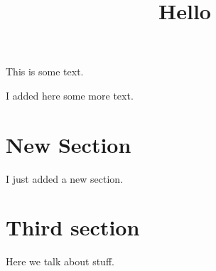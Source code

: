 \documentclass{article}
\title{Hello}
\begin{document}
\maketitle
	
This is some text.

I added here some more text.

\section{New Section}

I just added a new section. 


\section{Third section}

Here we talk about stuff. 
\end{document}
